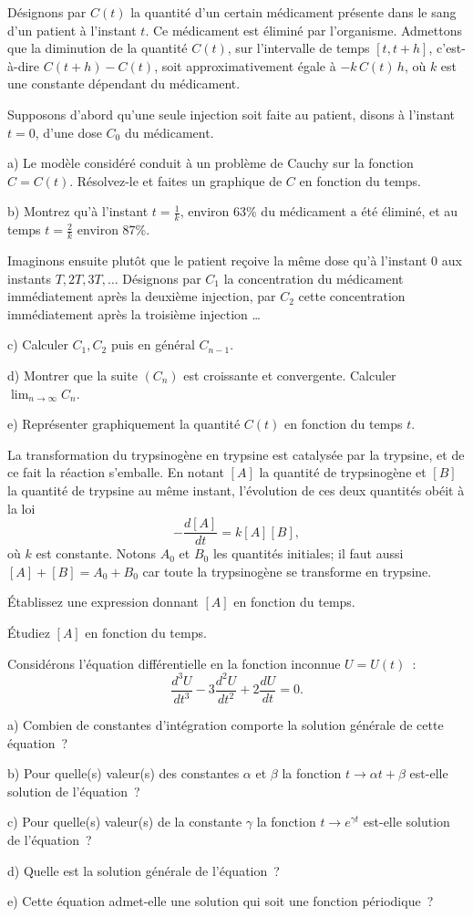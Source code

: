 \documentclass[12pt,french,oneside,a4paper]{memoir} %
\begin{document}
\begin{exo}
Désignons par $C(t)$ la quantité d'un certain médicament
présente dans le sang d'un patient à l'instant $t$. Ce
médicament est éliminé par l'organisme. Admettons que la
diminution de la quantité $C(t)$, sur l'intervalle de temps
$[t,t+h]$, c'est-à-dire $C(t+h)-C(t)$, soit approximativement
égale à $-k\,C(t)\,h$, où $k$ est une constante dépendant du
médicament.

Supposons d'abord qu'une seule injection soit faite au patient,
disons à l'instant $t=0$, d'une dose $C_0$ du médicament.

a) Le modèle considéré conduit à un problème de Cauchy
sur la fonction $C=C(t)$. Résolvez-le et faites un graphique de
$C$ en fonction du temps.

b) Montrez qu'à l'instant $\displaystyle{t=\frac{1}{k}}$, environ
63\% du médicament a été éliminé, et au temps 
$\displaystyle{t=\frac{2}{k}}$ environ 87\%.

Imaginons ensuite plutôt que le patient reçoive la même dose
qu'à l'instant 0 aux instants $T, 2T, 3T, \ldots$ Désignons par
$C_1$ la concentration du médicament immédiatement après la
deuxième injection, par $C_2$ cette concentration immédiatement
après la troisième injection \ldots

c) Calculer $C_1, C_2$ puis en général $C_{n-1}$.

d) Montrer que la suite $(C_n)$ est croissante et convergente.
Calculer $\displaystyle{\lim_{n\rightarrow\infty}C_n}$.

e) Représenter graphiquement la quantité $C(t)$ en fonction du
temps $t$.
\end{exo}
\begin{exo}
La transformation du trypsinogène en trypsine est
catalysée par la trypsine, et de ce fait la réaction s'emballe.
En notant $[A]$ la quantité de trypsinogène et $[B]$ la
quantité de trypsine au même instant, l'évolution de ces deux
quantités obéit à la loi
$$
-\frac{d[A]}{dt}=k[A][B],
$$
où $k$ est constante. Notons $A_0$ et $B_0$ les quantités
initiales; il faut aussi $[A]+[B]=A_0+B_0$ car toute la
trypsinogène se transforme en trypsine.

Établissez une expression donnant $[A]$ en fonction du temps.

Étudiez $[A]$ en fonction du temps.
\end{exo}
\begin{exo}
Considérons l'équation différentielle en la fonction
inconnue $U=U(t)$~:
$$
\displaystyle{\frac{d^3U}{dt^3}-3\frac{d^2U}{dt^2}+2\frac{dU}{dt}=0.}
$$

a) Combien de constantes d'intégration comporte la solution
générale de cette équation~?

b) Pour quelle(s) valeur(s) des constantes $\alpha$ et $\beta$ la
fonction $t\rightarrow \alpha t+\beta$ est-elle solution de
l'équation~?

c) Pour quelle(s) valeur(s) de la constante $\gamma$ la fonction
$\displaystyle{t\rightarrow e^{\gamma t}}$ est-elle solution de
l'équation~?

d) Quelle est la solution générale de l'équation~?

e) Cette équation admet-elle une solution qui soit une fonction
périodique~?
\end{exo}
\end{document}
